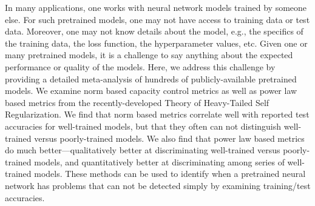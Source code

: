 
In many applications, one works with neural network models trained by someone else.
For such pretrained models, one may not have access to training data or test data.
Moreover, one may not know details about the model, e.g., the specifics of the training data, the loss function, the hyperparameter values, etc.
Given one or many pretrained models, it is a challenge to say anything about the expected performance or quality of the models.
Here, we address this challenge by providing a detailed meta-analysis of hundreds of publicly-available pretrained models.
We examine norm based capacity control metrics as well as power law based metrics from the recently-developed Theory of Heavy-Tailed Self Regularization.
We find that norm based metrics correlate well with reported test accuracies for well-trained models, but that they often can not distinguish well-trained versus poorly-trained models.
We also find that power law based metrics do much better---qualitatively better at discriminating well-trained versus poorly-trained models, and quantitatively better at discriminating among series of well-trained models.
These methods can be used to identify when a pretrained neural network has problems that can not be detected simply by examining training/test accuracies.

